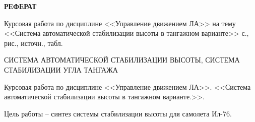 \begin{center}
\textbf{\large РЕФЕРАТ}
\end{center}



Курсовая работа по дисциплине <<Управление движением ЛА>> на тему <<Система автоматической стабилизации высоты в тангажном варианте>> \pageref{LastPage} с.,  рис.,  источн.,  табл. 

СИСТЕМА АВТОМАТИЧЕСКОЙ СТАБИЛИЗАЦИИ ВЫСОТЫ, СИСТЕМА СТАБИЛИЗАЦИИ УГЛА ТАНГАЖА 


Курсовая работа по дисциплине <<Управление движением ЛА>>. <<Система автоматической стабилизации высоты в тангажном варианте.>>.


Цель работы -- синтез системы стабилизации высоты для самолета Ил-76. 


